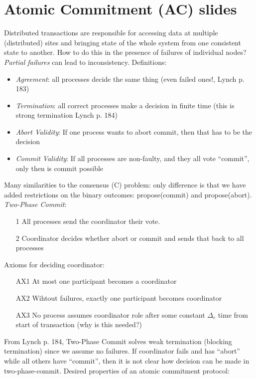 \documentclass[a4paper,10pt,]{article}
\begin{document}
\section{Atomic Commitment (AC) slides}
Distributed transactions are responsible for accessing data at multiple (distributed) sites and bringing state of the whole system from one consistent state to another.  How to do this in the presence of failures of individual nodes?  \emph{Partial failures} can lead to inconsistency.
Definitions:
\begin{itemize}
  \item \emph{Agreement}: all processes decide the same thing (even failed ones!, Lynch p. 183)
  \item \emph{Termination}: all correct processes make a decision in finite time (this is strong termination Lynch p. 184)
  \item \emph{Abort Validity}: If one process wants to abort commit, then that has to be the decision
  \item \emph{Commit Validity}: If all processes are non-faulty, and they all vote ``commit'', only then is commit possible
\end{itemize}
Many similarities to the consensus (C) problem: only difference is that we have added restrictions on the binary outcomes: propose(commit) and propose(abort). \\
\emph{Two-Phase Commit}:
\begin{itemize}
  \item[1] All processes send the coordinator their vote.
  \item[2] Coordinator decides whether abort or commit and sends that back to all processes
\end{itemize}
Axioms for deciding coordinator:
\begin{itemize}
  \item[AX1] At most one participant becomes a coordinator
  \item[AX2] Wihtout failures, exactly one participant becomes coordinator
  \item[AX3] No process assumes coordinator role after some constant $\Delta_c$ time from start of transaction (why is this needed?)
\end{itemize}
From Lynch p. 184, Two-Phase Commit solves weak termination (blocking termination) since we assume no failures.  If coordinator fails and has ``abort'' while all others have ``commit'', then it is not clear how decision can be made in two-phase-commit.
Desired properties of an atomic commitment protocol:
\end{document}
